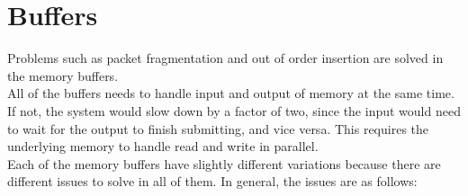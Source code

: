 \section{Buffers}
Problems such as packet fragmentation and out of order insertion are solved in
the memory buffers.\\
All of the buffers needs to handle input and output of
memory at the same time. If not, the system would slow down by a factor of two,
since the input would need to wait for the output to finish submitting, and
vice versa. This requires the underlying memory to handle read and write in
parallel. \\
Each of the memory buffers have slightly different variations because
there are different issues to solve in all of them. In general, the issues
are as follows: 

